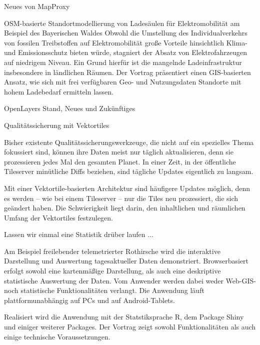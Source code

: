 %
{Neues von MapProxy}%
{}%
{}

%
{OSM-basierte Standortmodellierung von Ladesäulen für Elektromobilität am Beispiel des Bayerischen Waldes}%
{}%
{Obwohl die Umstellung des Individualverkehrs von fossilen Treibstoffen auf Elektromobilität große
Vorteile hinsichtlich Klima- und Emissionsschutz bieten würde, stagniert der Absatz von
Elektrofahrzeugen auf niedrigem Niveau. Ein Grund hierfür ist die mangelnde Ladeinfrastruktur
insbesondere in ländlichen Räumen. Der Vortrag präsentiert einen GIS-basierten Ansatz, wie sich mit
frei verfügbaren Geo- und Nutzungsdaten Standorte mit hohem Ladebedarf ermitteln lassen.}

%
{OpenLayers}%
{Stand, Neues und Zukünftiges}%
{}

%
{Qualitätssicherung mit Vektortiles}%
{}%
{Bisher existente Qualitätssicherungswerkzeuge, die nicht auf ein spezielles Thema fokussiert sind,
  können ihre Daten meist nur täglich aktualisieren, denn sie prozessieren jedes Mal den gesamten
  Planet. In einer Zeit, in der öffentliche Tileserver minütliche Diffs beziehen, sind tägliche
  Updates eigentlich zu langsam.

Mit einer Vektortile-basierten Architektur sind häufigere Updates möglich, denn es werden – wie bei
einem Tileserver – nur die Tiles neu prozessiert, die sich geändert haben. Die Schwierigkeit liegt
darin, den inhaltlichen und räumlichen Umfang der Vektortiles festzulegen.}

%
{Lassen wir einmal eine Statistik drüber laufen ...}%
{Am Beispiel freilebender telemetrierter Rothirsche wird die interaktive Darstellung und Auswertung
  tagesaktueller Daten demonstriert. Browserbasiert erfolgt sowohl eine kartenmäßige Darstellung,
  als auch eine deskriptive statistische Auswertung der Daten. Vom Anwender werden dabei weder
  Web-GIS- noch statistische Funktionalitäten verlangt. Die Anwendung läuft plattformunabhängig auf
  PCs und auf Android-Tablets.

Realisiert wird die Anwendung mit der Statstiksprache R, dem Package Shiny und einiger weiterer
Packages. Der Vortrag zeigt sowohl Funktionalitäten als auch einige technische Voraussetzungen.}

